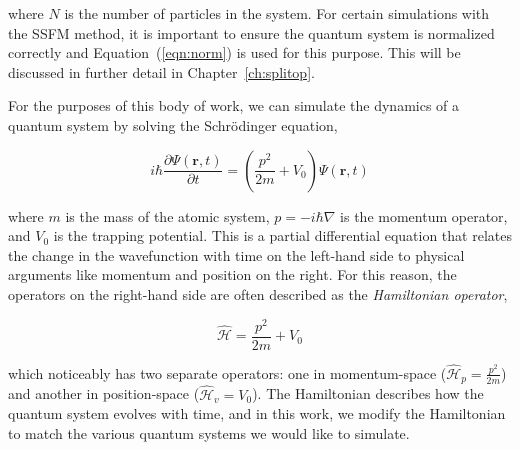 \noindent where $N$ is the number of particles in the system.
For certain simulations with the SSFM method, it is important to ensure the quantum system is normalized correctly and Equation~(\ref{eqn:norm}) is used for this purpose.
This will be discussed in further detail in Chapter~\ref{ch:splitop}.

For the purposes of this body of work, we can simulate the dynamics of a quantum system by solving the Schr\"odinger equation,

\begin{equation}
    i\hbar\frac{\partial\Psi(\mathbf{r},t)}{\partial t} = \left(\frac{p^2}{2m} + V_0\right) \Psi(\mathbf{r},t)
    \label{eqn:schrody}
\end{equation}

\noindent where $m$ is the mass of the atomic system, $p = -i\hbar\nabla$ is the momentum operator, and $V_0$ is the trapping potential.
This is a partial differential equation that relates the change in the wavefunction with time on the left-hand side to physical arguments like momentum and position on the right.
For this reason, the operators on the right-hand side are often described as the \textit{Hamiltonian operator}, 

\begin{equation}
\mathcal{\hat H} = \frac{p^2}{2m} + V_0
\end{equation}

\noindent which noticeably has two separate operators: one in momentum-space ($\mathcal{\hat H}_p = \frac{p^2}{2m}$) and another in position-space ($\mathcal{\hat H}_v = V_0$).
The Hamiltonian describes how the quantum system evolves with time, and in this work, we modify the Hamiltonian to match the various quantum systems we would like to simulate.

